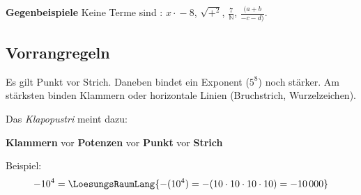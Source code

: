 \textbf{Gegenbeispiele}
Keine Terme sind \zB{}: $x \cdot{}-8$, $\sqrt{+^2}$, $\frac{7}{\mathbb{N}}$, $\frac{(a+b}{-c-d)}$.


\newpage

\subsection{Vorrangregeln}

Es gilt Punkt vor Strich. Daneben bindet ein Exponent (\zB $5^8$) noch
stärker. Am stärksten binden Klammern oder horizontale Linien
(Bruchstrich, Wurzelzeichen).

\begin{center}
  Das \textit{Klapopustri} meint dazu:

  \textbf{Klammern} vor \textbf{Potenzen} vor \textbf{Punkt} vor
  \textbf{Strich}
  
\end{center}




Beispiel:
$$-10^4 = \LoesungsRaumLang{-(10^4) = -
  (10\cdot{}10\cdot{}10\cdot{}10) = -10\,000}$$






